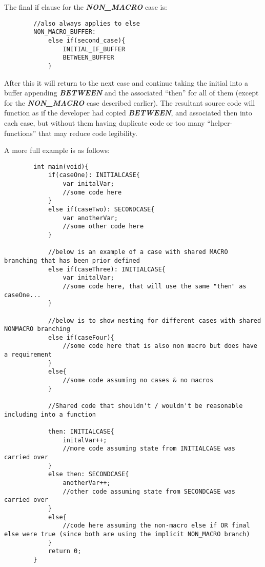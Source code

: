 \documentclass{article}
\newcommand{\textbfit}[1]{\textbf{\textit{#1}}}
\begin{document}
    \bigskip
        The final if clause for the \textbfit{NON\_MACRO} case is:
    \begin{lstlisting}
        //also always applies to else
        NON_MACRO_BUFFER:
            else if(second_case){
                INITIAL_IF_BUFFER
                BETWEEN_BUFFER
            }
    \end{lstlisting}

    \bigskip
        After this it will return to the next case and continue taking the initial into a buffer appending \textbfit{BETWEEN} and the associated ``then'' for all of them (except for the \textbfit{NON\_MACRO} case described earlier). The resultant source code will function as if the developer had copied \textbfit{BETWEEN}, and associated then into each case, but without them having duplicate code or too many ``helper-functions'' that may reduce code legibility.

    \newpage
        A more full example is as follows:

    \begin{lstlisting}
        int main(void){
            if(caseOne): INITIALCASE{
                var initalVar;
                //some code here
            }
            else if(caseTwo): SECONDCASE{
                var anotherVar;
                //some other code here
            }

            //below is an example of a case with shared MACRO branching that has been prior defined
            else if(caseThree): INITIALCASE{
                var initalVar;
                //some code here, that will use the same "then" as caseOne...
            }

            //below is to show nesting for different cases with shared NONMACRO branching
            else if(caseFour){
                //some code here that is also non macro but does have a requirement
            }
            else{
                //some code assuming no cases & no macros
            }

            //Shared code that shouldn't / wouldn't be reasonable including into a function

            then: INITIALCASE{
                initalVar++;
                //more code assuming state from INITIALCASE was carried over
            }
            else then: SECONDCASE{
                anotherVar++;
                //other code assuming state from SECONDCASE was carried over
            }
            else{
                //code here assuming the non-macro else if OR final else were true (since both are using the implicit NON_MACRO branch)
            }
            return 0;
        }
    \end{lstlisting}
\end{document}

